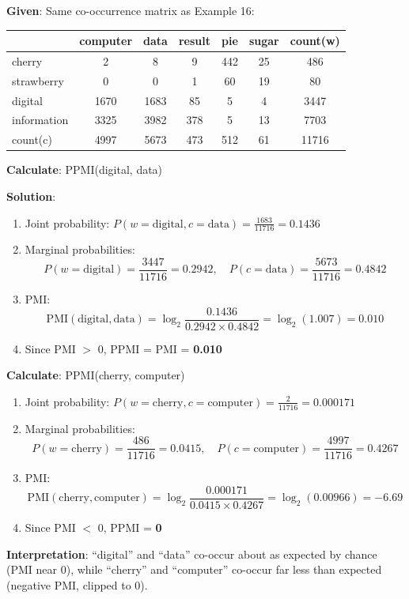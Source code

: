 \documentclass[11pt,a4paper]{article}
\begin{document}
\begin{tcolorbox}[colback=green!5!white,colframe=green!75!black,title=\textbf{Worked Example 17: PPMI for Another Word-Context Pair}]
\textbf{Given}: Same co-occurrence matrix as Example 16:
\begin{center}
\begin{tabular}{|l|c|c|c|c|c|c|}
\hline
 & computer & data & result & pie & sugar & count(w) \\ \hline
cherry & 2 & 8 & 9 & 442 & 25 & 486 \\ \hline
strawberry & 0 & 0 & 1 & 60 & 19 & 80 \\ \hline
digital & 1670 & 1683 & 85 & 5 & 4 & 3447 \\ \hline
information & 3325 & 3982 & 378 & 5 & 13 & 7703 \\ \hline
count(c) & 4997 & 5673 & 473 & 512 & 61 & 11716 \\ \hline
\end{tabular}
\end{center}

\textbf{Calculate}: PPMI(digital, data)

\textbf{Solution}:
\begin{enumerate}
    \item Joint probability: $P(w=\text{digital}, c=\text{data}) = \frac{1683}{11716} = 0.1436$
    \item Marginal probabilities:
    \[
    P(w=\text{digital}) = \frac{3447}{11716} = 0.2942, \quad
    P(c=\text{data}) = \frac{5673}{11716} = 0.4842
    \]
    \item PMI:
    \[
    \text{PMI}(\text{digital}, \text{data}) = \log_2 \frac{0.1436}{0.2942 \times 0.4842} = \log_2(1.007) = 0.010
    \]
    \item Since PMI $>$ 0, PPMI = PMI = \textbf{0.010}
\end{enumerate}

\textbf{Calculate}: PPMI(cherry, computer)
\begin{enumerate}
    \item Joint probability: $P(w=\text{cherry}, c=\text{computer}) = \frac{2}{11716} = 0.000171$
    \item Marginal probabilities:
    \[
    P(w=\text{cherry}) = \frac{486}{11716} = 0.0415, \quad
    P(c=\text{computer}) = \frac{4997}{11716} = 0.4267
    \]
    \item PMI:
    \[
    \text{PMI}(\text{cherry}, \text{computer}) = \log_2 \frac{0.000171}{0.0415 \times 0.4267} = \log_2(0.00966) = -6.69
    \]
    \item Since PMI $<$ 0, PPMI = \textbf{0}
\end{enumerate}

\textbf{Interpretation}: ``digital'' and ``data'' co-occur about as expected by chance (PMI near 0), while ``cherry'' and ``computer'' co-occur far less than expected (negative PMI, clipped to 0).
\end{tcolorbox}
\end{document}
